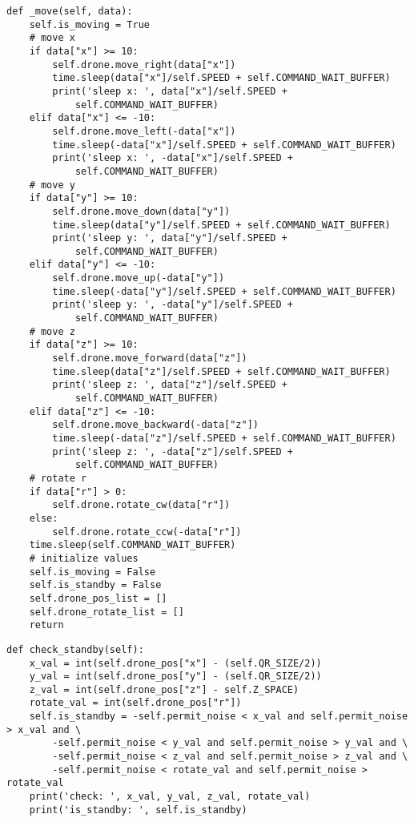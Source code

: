 \begin{lstlisting}[caption=move method code,label=move_method]
def _move(self, data):          
    self.is_moving = True
    # move x                   
    if data["x"] >= 10:            
        self.drone.move_right(data["x"])
        time.sleep(data["x"]/self.SPEED + self.COMMAND_WAIT_BUFFER)
        print('sleep x: ', data["x"]/self.SPEED +
            self.COMMAND_WAIT_BUFFER)
    elif data["x"] <= -10:
        self.drone.move_left(-data["x"])
        time.sleep(-data["x"]/self.SPEED + self.COMMAND_WAIT_BUFFER)
        print('sleep x: ', -data["x"]/self.SPEED +                                                                                                           
            self.COMMAND_WAIT_BUFFER)
    # move y
    if data["y"] >= 10:
        self.drone.move_down(data["y"])
        time.sleep(data["y"]/self.SPEED + self.COMMAND_WAIT_BUFFER)
        print('sleep y: ', data["y"]/self.SPEED +
            self.COMMAND_WAIT_BUFFER)
    elif data["y"] <= -10:
        self.drone.move_up(-data["y"])
        time.sleep(-data["y"]/self.SPEED + self.COMMAND_WAIT_BUFFER)
        print('sleep y: ', -data["y"]/self.SPEED +
            self.COMMAND_WAIT_BUFFER)
    # move z
    if data["z"] >= 10:
        self.drone.move_forward(data["z"])
        time.sleep(data["z"]/self.SPEED + self.COMMAND_WAIT_BUFFER)
        print('sleep z: ', data["z"]/self.SPEED +
            self.COMMAND_WAIT_BUFFER)
    elif data["z"] <= -10:
        self.drone.move_backward(-data["z"])
        time.sleep(-data["z"]/self.SPEED + self.COMMAND_WAIT_BUFFER)
        print('sleep z: ', -data["z"]/self.SPEED +
            self.COMMAND_WAIT_BUFFER)
    # rotate r
    if data["r"] > 0:
        self.drone.rotate_cw(data["r"])
    else:
        self.drone.rotate_ccw(-data["r"])
    time.sleep(self.COMMAND_WAIT_BUFFER)
    # initialize values
    self.is_moving = False
    self.is_standby = False
    self.drone_pos_list = []
    self.drone_rotate_list = []
    return
\end{lstlisting}

\begin{lstlisting}[caption=check standby method, label=check_standby]
def check_standby(self):
    x_val = int(self.drone_pos["x"] - (self.QR_SIZE/2))
    y_val = int(self.drone_pos["y"] - (self.QR_SIZE/2))
    z_val = int(self.drone_pos["z"] - self.Z_SPACE)
    rotate_val = int(self.drone_pos["r"])
    self.is_standby = -self.permit_noise < x_val and self.permit_noise > x_val and \
        -self.permit_noise < y_val and self.permit_noise > y_val and \
        -self.permit_noise < z_val and self.permit_noise > z_val and \
        -self.permit_noise < rotate_val and self.permit_noise > rotate_val
    print('check: ', x_val, y_val, z_val, rotate_val)
    print('is_standby: ', self.is_standby)
\end{lstlisting}